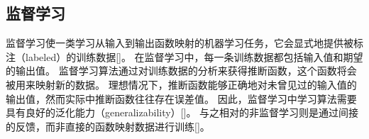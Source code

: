 
\subsection{监督学习}

监督学习使一类学习从输入到输出函数映射的机器学习任务，它会显式地提供被标注（labeled）的训练数据[]。
在监督学习中，每一条训练数据都包括输入值和期望的输出值。
监督学习算法通过对训练数据的分析来获得推断函数，这个函数将会被用来映射新的数据。
理想情况下，推断函数能够正确地对未曾见过的输入值的输出值，然而实际中推断函数往往存在误差值。
因此，监督学习中学习算法需要具有良好的泛化能力（generalizability）[]。
与之相对的非监督学习则是通过间接的反馈，而非直接的函数映射数据进行{\model}训练[]。


